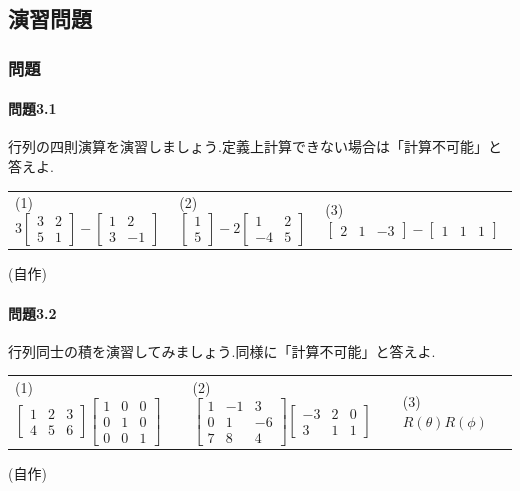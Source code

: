 \subsection{演習問題}
\subsubsection*{問題}
\paragraph{問題3.1}
行列の四則演算を演習しましょう.定義上計算できない場合は「計算不可能」と答えよ.\\
\begin{tabular}{lll}
    (1)\;$3\begin{bmatrix}
        3 & 2 \\ 5 & 1
    \end{bmatrix}-\begin{bmatrix}
        1 & 2 \\ 3 & -1
    \end{bmatrix}$ & 
    (2)\;$\begin{bmatrix}
        1 \\ 5
    \end{bmatrix}-2\begin{bmatrix}
        1 & 2 \\ -4 & 5
    \end{bmatrix}$ &
    (3)\;$\begin{bmatrix}
        2 & 1 & -3 
    \end{bmatrix}-\begin{bmatrix}
        1 & 1 & 1
    \end{bmatrix}$
\end{tabular}
\begin{flushright}
    (自作)
\end{flushright}
\paragraph{問題3.2}
行列同士の積を演習してみましょう.同様に「計算不可能」と答えよ.\\
\begin{tabular}{lll}
    (1)\;$\begin{bmatrix}
        1 & 2 & 3 \\ 4 & 5 & 6
    \end{bmatrix}\begin{bmatrix}
        1 & 0 & 0 \\ 0 & 1 & 0 \\ 0 & 0 & 1
    \end{bmatrix}$ & 
    (2)\;$\begin{bmatrix}
        1 & -1 & 3 \\ 0 & 1 & -6 \\ 7 & 8 & 4
    \end{bmatrix}\begin{bmatrix}
        -3 & 2 & 0 \\ 3 & 1 & 1 
    \end{bmatrix}$ & 
    (3)\;$R(\theta)R(\phi)$
\end{tabular}
\begin{flushright}
    (自作)
\end{flushright}
